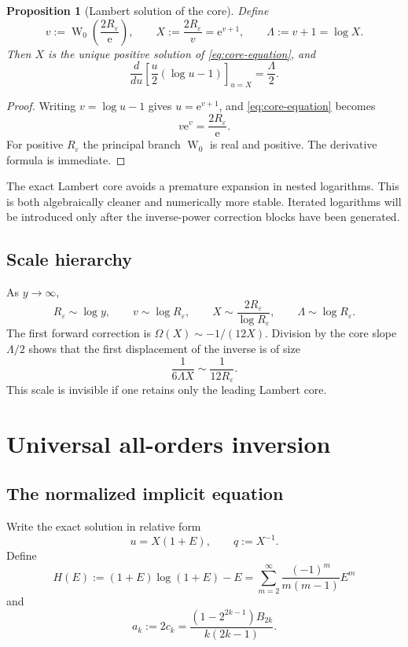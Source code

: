 \documentclass[11pt,a4paper,oneside]{book}
\newtheorem{proposition}[theorem]{Proposition}
\newcommand{\e}{\mathrm e}
\newcommand{\W}{\operatorname W}
\newcommand{\eps}{\varepsilon}
\begin{document}
\begin{proposition}[Lambert solution of the core]\label{prop:Lambert-core}
Define
\begin{equation}\label{eq:v-X-Lambda}
 v:=\W_0\!\left(\frac{2R_\eps}{\e}\right),
 \qquad
 X:=\frac{2R_\eps}{v}=\e^{v+1},
 \qquad
 \Lambda:=v+1=\log X.
\end{equation}
Then \(X\) is the unique positive solution of \cref{eq:core-equation}, and
\[
 \frac{d}{du}\left[\frac{u}{2}(\log u-1)\right]_{u=X}
 =\frac{\Lambda}{2}.
\]
\end{proposition}

\begin{proof}
Writing \(v=\log u-1\) gives \(u=\e^{v+1}\), and
\cref{eq:core-equation} becomes
\[
 v\e^v=\frac{2R_\eps}{\e}.
\]
For positive \(R_\eps\) the principal branch \(\W_0\) is real and positive.
The derivative formula is immediate.
\end{proof}

The exact Lambert core avoids a premature expansion in nested logarithms.
This is both algebraically cleaner and numerically more stable.  Iterated
logarithms will be introduced only after the inverse-power correction blocks
have been generated.

\section{Scale hierarchy}

As \(y\to\infty\),
\[
 R_\eps\sim\log y,\qquad
 v\sim\log R_\eps,\qquad
 X\sim\frac{2R_\eps}{\log R_\eps},\qquad
 \Lambda\sim\log R_\eps.
\]
The first forward correction is \(\Omega(X)\sim-1/(12X)\).  Division by the
core slope \(\Lambda/2\) shows that the first displacement of the inverse is
of size
\[
 \frac{1}{6\Lambda X}\sim\frac{1}{12R_\eps}.
\]
This scale is invisible if one retains only the leading Lambert core.

\chapter{Universal all-orders inversion}

\section{The normalized implicit equation}

Write the exact solution in relative form
\begin{equation}\label{eq:E-def}
 u=X(1+E),\qquad q:=X^{-1}.
\end{equation}
Define
\begin{equation}\label{eq:H-def}
 H(E):=(1+E)\log(1+E)-E
 =\sum_{m=2}^\infty\frac{(-1)^m}{m(m-1)}E^m
\end{equation}
and
\begin{equation}\label{eq:ak}
 a_k:=2c_k
 =\frac{(1-2^{2k-1})B_{2k}}{k(2k-1)}.
\end{equation}
\end{document}
